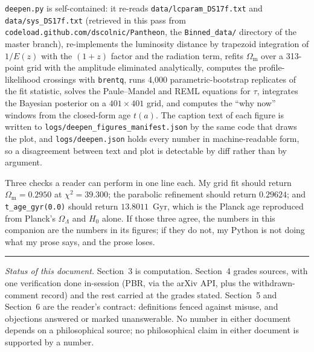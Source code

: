 \documentclass[11pt]{article}
\begin{document}
\texttt{deepen.py} is self-contained: it re-reads \texttt{data/lcparam\_DS17f.txt} and
\texttt{data/sys\_DS17f.txt} (retrieved in this pass from \texttt{codeload.github.com/dscolnic/Pantheon},
the \texttt{Binned\_data/} directory of the master branch), re-implements the luminosity distance by
trapezoid integration of $1/E(z)$ with the $(1+z)$ factor and the radiation term, refits $\Omega_{\text{m}}$
over a 313-point grid with the amplitude eliminated analytically, computes the profile-likelihood
crossings with \texttt{brentq}, runs 4,000 parametric-bootstrap replicates of the fit statistic, solves
the Paule--Mandel and REML equations for $\tau$, integrates the Bayesian posterior on a
$401\times401$ grid, and computes the ``why now'' windows from the closed-form age $t(a)$. The caption
text of each figure is written to \texttt{logs/deepen\_figures\_manifest.json} by the same code that
draws the plot, and \texttt{logs/deepen.json} holds every number in machine-readable form, so a
disagreement between text and plot is detectable by diff rather than by argument.

Three checks a reader can perform in one line each. My grid fit should return
$\Omega_{\text{m}}=0.2950$ at $\chi^2=39.300$; the parabolic refinement should return $0.29624$; and
\texttt{t\_age\_gyr(0.0)} should return $13.8011$~Gyr, which is the Planck age reproduced from
Planck's $\Omega_\Lambda$ and $H_0$ alone. If those three agree, the numbers in this companion are
the numbers in its figures; if they do not, my Python is not doing what my prose says, and the
prose loses.

\vspace{6pt}
\hrule
\vspace{6pt}
\emph{Status of this document.} Section~3 is computation. Section~4 grades sources, with one
verification done in-session (PBR, via the arXiv API, plus the withdrawn-comment record) and the rest
carried at the grades stated. Section~5 and Section~6 are the reader's contract: definitions fenced
against misuse, and objections answered or marked unanswerable. No number in either document depends
on a philosophical source; no philosophical claim in either document is supported by a number.
\end{document}
